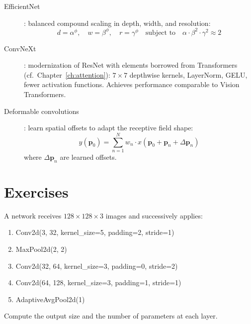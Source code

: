 \begin{sota}[title=\textbf{Modern CNN architectures}]
\begin{description}
  \item[EfficientNet] \cite{tan2019efficientnet}: balanced compound scaling
    in depth, width, and resolution:
    \begin{equation}
      d = \alpha^\phi, \quad w = \beta^\phi, \quad r = \gamma^\phi
      \quad \text{subject to} \quad \alpha \cdot \beta^2 \cdot \gamma^2 \approx 2
    \end{equation}

  \item[ConvNeXt] \cite{liu2022convnet}: modernization of ResNet with
    elements borrowed from Transformers (cf.\ Chapter~\ref{ch:attention}):
    $7 \times 7$ depthwise kernels, LayerNorm, GELU, fewer activation functions.
    Achieves performance comparable to Vision Transformers.

  \item[Deformable convolutions] \cite{dai2017deformable}: learn spatial
    offsets to adapt the receptive field shape:
    \begin{equation}
      y(\mathbf{p}_0) = \sum_{n=1}^{N} w_n \cdot x(\mathbf{p}_0 + \mathbf{p}_n + \Delta\mathbf{p}_n)
    \end{equation}
    where $\Delta\mathbf{p}_n$ are learned offsets.
\end{description}
\end{sota}

\section{Exercises}
\label{sec:cnn-exercises}

\begin{exercise}
A network receives $128 \times 128 \times 3$ images and successively
applies:
\begin{enumerate}
  \item Conv2d(3, 32, kernel\_size=5, padding=2, stride=1)
  \item MaxPool2d(2, 2)
  \item Conv2d(32, 64, kernel\_size=3, padding=0, stride=2)
  \item Conv2d(64, 128, kernel\_size=3, padding=1, stride=1)
  \item AdaptiveAvgPool2d(1)
\end{enumerate}
Compute the output size and the number of parameters at each layer.
\end{exercise}

